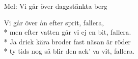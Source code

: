 \begin{SongText}
    \begin{SongInfo}
        Mel: Vi går över daggstänkta berg
    \end{SongInfo}
    \begin{SongVerse}
        Vi går över ån efter sprit, fallera,\\*%
        men efter vatten går vi ej en bit, fallera.\\*%
        Ja drick kära broder fast näsan är röder\\*%
        ty tids nog så blir den ack’ va vit, fallera.
    \end{SongVerse}
\end{SongText}
